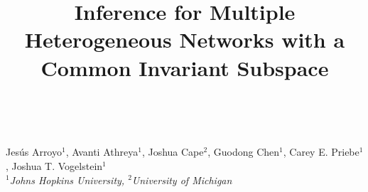 \documentclass[a0,landscape]{a0poster}
\title{Inference for Multiple Heterogeneous Networks with a\\ Common Invariant Subspace
}
\begin{document}
		
\hspace{-1cm}								%
\colorbox{JHUblue}{

	\hspace{1cm}
	\begin{minipage}[c]{0.75\linewidth}
	\vspace{-2cm}
	\maketitle
	\vspace{-2cm}
	\end{minipage}
	\begin{minipage}[c]{0.3\linewidth}
		\vspace{-1cm}
		\vspace{-1cm}
	\end{minipage}
}
\\%



\hspace{-1cm}\colorbox{JHUGray}{\hspace{1cm}\begin{minipage}{1189mm}					%
{\vspace{0.5cm}
\color{white}\sffamily\huge		%
Jes\'us Arroyo$^{1}$, Avanti Athreya$^{1}$, Joshua Cape$^{2}$, Guodong Chen$^{1}$, Carey E. Priebe$^{1}$,  Joshua T. Vogelstein$^{1}$\\
\textit{$^{1}$Johns Hopkins University, $^{2}$University of Michigan}}
\end{minipage}}
\end{document}
